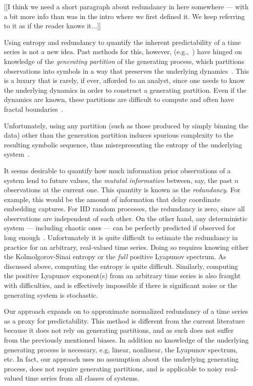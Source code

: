 [[I think we need a short paragraph about redundancy in here somewhere
    --- with a bit more info than was in the intro where we first
    defined it.  We keep referring to it as if the reader knows
    it...]]

Using entropy and redundancy to quantify the inherent predictability
of a time series is not a new idea.  Past methods for this, however,
(e.g.,~\cite{Shannon1951, mantegna1994linguistic}) have hinged on
knowledge of the \emph{generating partition} of the generating
process, which partitions observations into symbols in a way that
preserves the underlying dynamics~\cite{lind95}.  This is a luxury
that is rarely, if ever, afforded to an analyst, since one needs to
know the underlying dynamics in order to construct a generating
partition.  Even if the dynamics are known, these partitions are
difficult to compute and often have fractal
boundaries~\cite{eisele1999}.

Unfortunately, using any partition (such as those produced by simply
binning the data) other than the generation partition induces spurious
complexity to the resulting symbolic sequence, thus misrepresenting
the entropy of the underlying system~\cite{bollt2001}.

It seems desirable to quantify how much information prior observations of a system lend to future values, the \emph{mututal information} between, say, the past $n$ observations at the current one. This quantity is known as the \emph{redundancy}. For example, this would be the amount of information that delay coordinate embedding captures. For IID random processes,  the redundancy is zero, since all observations are independent of each other. On the other hand, any deterministic system --- including chaotic ones --- can be perfectly predicted if observed for long enough~\cite{weigend-book}. Unfortunately it is quite difficult to estimate the redundancy in practice for an arbitrary, real-valued time series. Doing so requires knowing either the Kolmolgorov-Sinai entropy or the \emph{full} positive Lyapunov spectrum. As discussed above, computing the entropy is quite difficult. Similarly, computing the positive Lyapunov exponent(s) from an arbitrary time series is also fraught with difficulties, and is effectively impossible if there is significant noise or the generating system is stochastic.

Our approach expands on \cite{bandt2002per} to approximate normalized redundancy of a time series as a proxy for predictability. This method is different from the current literature because it does not rely on generating partitions, and as such does not suffer from the previously mentioned biases. In addition no knowledge of the underlying generating process is necessary, e.g, linear, nonlinear, the Lyapunov spectrum, etc. In fact, our approach uses no assumption about the underlying generating process, does not require generating partitions, and is applicable to noisy real-valued time series from all classes of systems.


